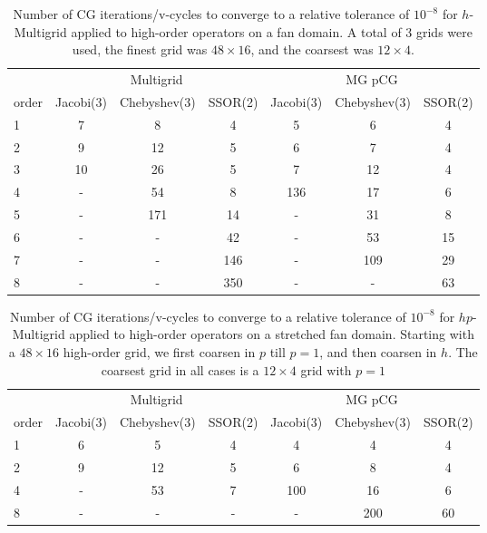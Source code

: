 \begin{table}
  \caption{\label{tab:homg} Number of CG iterations/v-cycles to converge to a relative tolerance of $10^{-8}$ for $h$-Multigrid applied to high-order operators on a fan domain. A total of 3 grids were used, the finest grid was $48\times 16$, and the coarsest was $12\times 4$.}
		\centering
    \begin{tabular}{|l|c|c|c|c|c|c|} 
	    \hline
				    & \multicolumn{3}{c|}{Multigrid} & \multicolumn{3}{c|}{MG pCG}\\  \cline{2-7}
			order & \scriptsize Jacobi(3)  &\scriptsize  Chebyshev(3)  &\scriptsize SSOR(2) &\scriptsize Jacobi(3)  &\scriptsize  Chebyshev(3)  &\scriptsize SSOR(2) \\
			\hline
      1 & 7  & 8  & 4 & 5 & 6 & 4 \\ 
	    2 & 9  & 12 & 5 & 6 & 7 & 4 \\	
			3 & 10 & 26 & 5 & 7 & 12 & 4 \\
      4 & -  & 54 & 8 & 136 & 17 & 6 \\
      5 & - & 171 & 14 & - & 31 & 8 \\
      6 & - & - & 42 & - & 53 & 15 \\
      7 & - & - & 146 & - & 109 & 29 \\
      8 & - & - & 350 & - & -  & 63 \\
      \hline
	  \end{tabular}
\end{table}


\begin{table}
  \caption{\label{tab:hpmg} Number of CG iterations/v-cycles to converge to a relative tolerance of $10^{-8}$ for $hp$-Multigrid applied to high-order operators on a stretched fan domain. Starting with a $48\times 16$ high-order grid, we first coarsen in $p$ till $p=1$, and then coarsen in $h$. The coarsest grid in all cases is a $12\times 4$ grid with $p=1$}
		\centering
		\begin{tabular}{|l|c|c|c|c|c|c|} 
	    \hline
				    & \multicolumn{3}{c|}{Multigrid} & \multicolumn{3}{c|}{MG pCG}\\  \cline{2-7}
			order & \scriptsize Jacobi(3)  &\scriptsize  Chebyshev(3)  &\scriptsize SSOR(2) &\scriptsize Jacobi(3)  &\scriptsize  Chebyshev(3)  &\scriptsize SSOR(2) \\
			\hline
				1 & 6  &  5 &  4 & 4 & 4 & 4 \\ 
        2 & 9 & 12 & 5 & 6 & 8 & 4 \\
				4 & - & 53 & 7 & 100 & 16 & 6 \\
        8 & - & -  & - & - & 200 & 60 \\
			\hline
	  \end{tabular}
\end{table}

